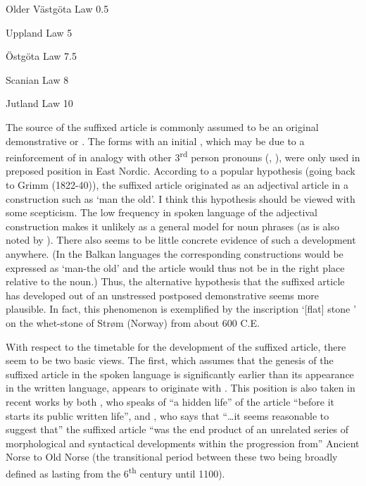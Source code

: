 Older Västgöta Law  0.5

Uppland Law  5

Östgöta Law  7.5

Scanian Law  8

Jutland Law  10

The source of the suffixed article is commonly assumed to be an original demonstrative  or . The forms with an initial , which may be due to a reinforcement of  in analogy with other 3\textsuperscript{rd} person pronouns (\citet[135]{Perridon1989}, \citet[723]{Syrett2002}), were only used in preposed position in East Nordic. According to a popular hypothesis (going back to Grimm (1822-40)), the suffixed article originated as an adjectival article in a construction such as ‘man the old’. I think this hypothesis should be viewed with some scepticism. The low frequency in spoken language of the adjectival construction makes it unlikely as a general model for noun phrases (as is also noted by \citet[63]{SaltveitEtAl1971}). There also seems to be little concrete evidence of such a development anywhere. (In the Balkan languages the corresponding constructions would be expressed as ‘man-the old’ and the article would thus not be in the right place relative to the noun.)  Thus, the alternative hypothesis that the suffixed article has developed out of an unstressed postposed demonstrative seems more plausible.  In fact, this phenomenon is exemplified by the inscription  ‘[flat] stone ’ on the whet-stone of Strøm (Norway) from about 600 C.E. 

With respect to the timetable for the development of the suffixed article, there seem to be two basic views. The first, which assumes that the genesis of the suffixed article in the spoken language is significantly earlier than its appearance in the written language, appears to originate with \citet{Neckel1924}.  This position is also taken in recent works by both \citet[142]{Perridon1989}, who speaks of “a hidden life” of the article “before it starts its public written life”, and \citet[723]{Syrett2002}, who says that “…it seems reasonable to suggest that” the suffixed article “was the end product of an unrelated series of morphological and syntactical developments within the progression from” Ancient Norse to Old Norse (the transitional period between these two being broadly defined as lasting from the 6\textsuperscript{th} century until 1100). 

